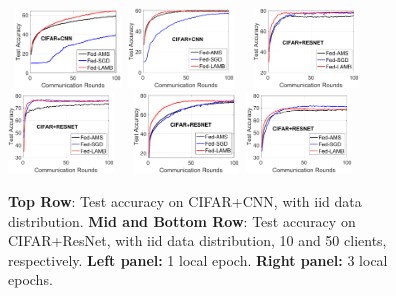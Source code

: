 \documentclass{article}
\begin{document}
\begin{figure}[t]
    \begin{center}
        \mbox{
        \includegraphics[width=0.25\textwidth]{figure/cifar_testerror_cnn_ep1_client50_iid1.eps}
        \includegraphics[width=0.25\textwidth]{figure/cifar_testerror_cnn_ep3_client50_iid1.eps}
        }
            \mbox{
        \includegraphics[width=0.25\textwidth]{figure/cifar_testerror_resnet_ep1_client10_iid1_SGD.eps}
        \includegraphics[width=0.25\textwidth]{figure/cifar_testerror_resnet_ep3_client10_iid1_SGD.eps}
        }
        \mbox{
        \includegraphics[width=0.25\textwidth]{figure/cifar_testerror_resnet_ep1_client50_iid1_SGD.eps}
        \includegraphics[width=0.25\textwidth]{figure/cifar_testerror_resnet_ep3_client50_iid1_SGD.eps}
        }
    \end{center}
	\caption{\textbf{Top Row}: Test accuracy on CIFAR+CNN, with iid data distribution. \textbf{Mid and Bottom Row}: Test accuracy on CIFAR+ResNet, with iid data distribution, 10 and 50 clients, respectively. \textbf{Left panel:} 1 local epoch. \textbf{Right panel:} 3 local epochs.}
	\label{fig:cifar-cnn-iid}
\end{figure}
\end{document}
